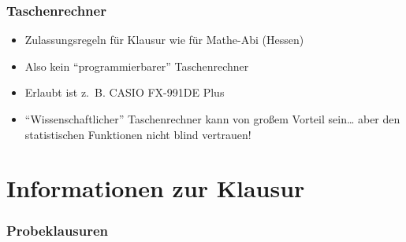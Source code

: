 \documentclass[
  11pt,
  ngerman,
  a4paper,
]{report}
\providecommand{\tightlist}{%
  \setlength{\itemsep}{0pt}\setlength{\parskip}{0pt}}
\begin{document}
\hypertarget{taschenrechner}{%
\subsection*{Taschenrechner}\label{taschenrechner}}

\begin{itemize}
\tightlist
\item
  Zulassungsregeln für Klausur wie für Mathe-Abi (Hessen)
\item
  Also kein \enquote{programmierbarer} Taschenrechner
\item
  Erlaubt ist z.~B. CASIO FX-991DE Plus
\item
  \enquote{Wissenschaftlicher} Taschenrechner kann von großem Vorteil sein\ldots{} aber den statistischen Funktionen nicht blind vertrauen!
\end{itemize}

\hypertarget{informationen-zur-klausur}{%
\chapter*{Informationen zur Klausur}\label{informationen-zur-klausur}}

\hypertarget{probeklausuren}{%
\subsection*{Probeklausuren}\label{probeklausuren}}
\end{document}
